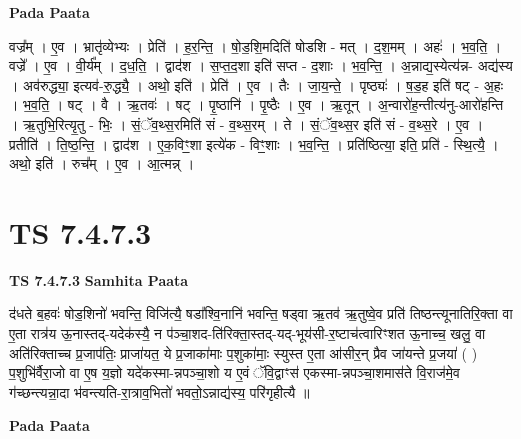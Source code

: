 \documentclass[17pt]{extarticle}
\begin{document}
\textbf{Pada Paata} \newline

वज्र᳚म् । ए॒व । भ्रातृ॑व्येभ्यः । प्रेति॑ । ह॒र॒न्ति॒ । षो॒ड॒शि॒मदिति॑ षोडशि - मत् । द॒श॒मम् । अहः॑ । भ॒व॒ति॒ । वज्रे᳚ । ए॒व । वी॒र्य᳚म् । द॒ध॒ति॒ । द्वाद॑श । स॒प्त॒द॒शा इति॑ सप्त - द॒शाः । भ॒व॒न्ति॒ । अ॒न्नाद्य॒स्येत्य॑न्न- अद्य॑स्य । अव॑रुद्ध्या॒ इत्यव॑-रु॒द्ध्यै॒ । अथो॒ इति॑ । प्रेति॑ । ए॒व । तैः । जा॒य॒न्ते॒ । पृष्ठ्यः॑ । ष॒ड॒ह इति॑ षट् - अ॒हः । भ॒व॒ति॒ । षट् । वै । ऋ॒तवः॑ । षट् । पृ॒ष्ठानि॑ । पृ॒ष्ठैः । ए॒व । ऋ॒तून् । अ॒न्वारो॑ह॒न्तीत्य॑नु-आरो॑हन्ति । ऋ॒तुभि॒रित्यृ॒तु - भिः॒ । सं॒ॅव॒थ्स॒रमिति॑ सं - व॒थ्स॒रम् । ते । सं॒ॅव॒थ्स॒र इति॑ सं - व॒थ्स॒रे । ए॒व । प्रतीति॑ । ति॒ष्ठ॒न्ति॒ । द्वाद॑श । ए॒क॒विꣳ॒॒शा इत्ये॑क - विꣳ॒॒शाः । भ॒व॒न्ति॒ । प्रति॑ष्ठित्या॒ इति॒ प्रति॑ - स्थि॒त्यै॒ । अथो॒ इति॑ । रुच᳚म् । ए॒व । आ॒त्मन्न् ।  \newline




\section*{ TS 7.4.7.3 }

\textbf{TS 7.4.7.3 } \newline
\textbf{Samhita Paata} \newline

द॑धते ब॒हवः॑ षोड॒शिनो॑ भवन्ति॒ विजि॑त्यै॒ षडा᳚श्वि॒नानि॑ भवन्ति॒ षड्वा ऋ॒तव॑ ऋ॒तुष्वे॒व प्रति॑ तिष्ठन्त्यूनातिरि॒क्ता वा ए॒ता रात्र॑य ऊ॒नास्तद्-यदेक॑स्यै॒ न प॑ञ्चा॒शद-ति॑रिक्ता॒स्तद्-यद्-भूय॑सी-र॒ष्टाच॑त्वारिꣳशत ऊ॒नाच्च॒ खलु॒ वा अति॑रिक्ताच्च प्र॒जाप॑तिः॒ प्राजा॑यत॒ ये प्र॒जाका॑माः प॒शुका॑माः॒ स्युस्त ए॒ता आ॑सीर॒न् प्रैव जा॑यन्ते प्र॒जया॑ ( ) प॒शुभि॑र्वैरा॒जो वा ए॒ष य॒ज्ञो यदे॑कस्मा-न्नपञ्चा॒शो य ए॒वं ॅवि॒द्वाꣳस॑ एकस्मा-न्नपञ्चा॒शमास॑ते वि॒राज॑मे॒व ग॑च्छन्त्यन्ना॒दा भ॑वन्त्यति-रा॒त्राव॒भितो॑ भवतो॒ऽन्नाद्य॑स्य॒ परि॑गृहीत्यै ॥ \newline

\textbf{Pada Paata} \newline
\end{document}
